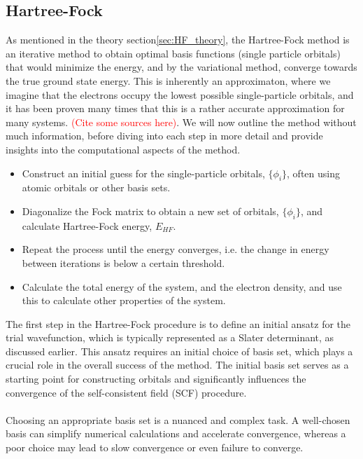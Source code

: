 \documentclass{subfiles}
\begin{document}
\subsection{Hartree-Fock}
As mentioned in the theory section\ref{sec:HF_theory}, the Hartree-Fock method is an iterative method to obtain optimal basis functions (single particle orbitals) that would minimize the energy, and by the variational method, converge towards the true ground state energy. This is inherently an approximaton, where we imagine that the electrons occupy the lowest possible single-particle orbitals, and it has been proven many times that this is a rather accurate approximation for many systems. \textcolor{red}{(Cite some sources here)}.
We will now outline the method without much information, before diving into each step in more detail and provide insights into the computational aspects of the method.
\begin{itemize}
    \item Construct an initial guess for the single-particle orbitals, $\{\phi_i\}$, often using atomic orbitals or other basis sets.
    \item Diagonalize the Fock matrix to obtain a new set of orbitals, $\{\phi_i\}$, and calculate Hartree-Fock energy, $E_{HF}$.
    \item Repeat the process until the energy converges, i.e. the change in energy between iterations is below a certain threshold.
    \item Calculate the total energy of the system, and the electron density, and use this to calculate other properties of the system.
\end{itemize}
The first step in the Hartree-Fock procedure is to define an initial ansatz for the trial wavefunction, which is typically represented as a Slater determinant, as discussed earlier. This ansatz requires an initial choice of basis set, which plays a crucial role in the overall success of the method. The initial basis set serves as a starting point for constructing orbitals and significantly influences the convergence of the self-consistent field (SCF) procedure.\\  
\\ Choosing an appropriate basis set is a nuanced and complex task. A well-chosen basis can simplify numerical calculations and accelerate convergence, whereas a poor choice may lead to slow convergence or even failure to converge. 
\end{document}
